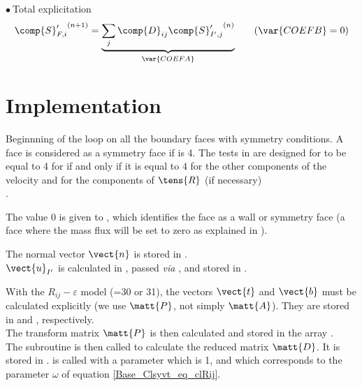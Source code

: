 $\bullet\ ${\sc Total explicitation}\\
\begin{equation}
\label{Base_Clsyvt_eq_clRexp}
{\comp{S}_{F,i}^\prime}^{(n+1)} =
\underbrace{\sum_j\comp{D}_{ij}{\comp{S}_{I',j}^\prime}^{(n)}}_{\var{COEFA}}
\qquad(\var{COEFB}=0)
\end{equation}

\section*{Implementation}
\label{Base_Clsyvt_prg_meo}%

Beginnning of the loop on all the boundary faces   with
symmetry conditions.
A face is considered as a symmetry face if
 is 4. The tests in  are designed
 for   to be equal to 4 for  if and only if it is equal
to 4 for the other components of the velocity and for the components of $\tens{R}$
(if necessary)\\.

The value 0 is given to  , which identifies the face as a
wall or symmetry face (a face where the mass flux will be set to zero as
explained in ).

The normal vector $\vect{n}$ is stored in .\\
$\vect{u}_{I'}$ is calculated in , passed {\em via} ,
and stored in .

With the $R_{ij}-\varepsilon$ model (=30 or 31), the vectors
 $\vect{t}$ and $\vect{b}$ must be calculated explicitly
(we use $\matt{P}$, not simply $\matt{A}$).
They are stored in  and
, respectively.\\
The transform matrix $\matt{P}$ is then calculated and stored in the array .\\
The subroutine  is then called to calculate the reduced
matrix $\matt{D}$. It is stored in .  is called
with a parameter  which is 1, and which corresponds to the parameter
$\omega$ of equation \ref{Base_Clsyvt_eq_clRij}.


